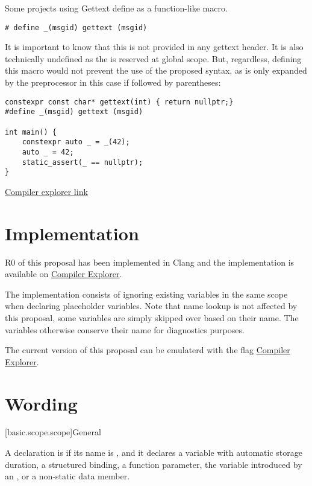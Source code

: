 \documentclass{wg21}
\begin{document}
{Some projects using Gettext define \tcode{_} as a function-like macro.

\begin{lstlisting}[style=color]
# define _(msgid) gettext (msgid)
\end{lstlisting}

It is important to know that this is not provided in any gettext header.
It is also technically undefined as the \tcode{_} is reserved at global scope.
But, regardless, defining this macro would not prevent the use of the proposed syntax, as \tcode{_} is only
expanded by the preprocessor in this case if followed by parentheses:

\begin{lstlisting}[style=color]
constexpr const char* gettext(int) { return nullptr;}
#define _(msgid) gettext (msgid)

int main() {
    constexpr auto _ = _(42);
    auto _ = 42;
    static_assert(_ == nullptr);
}

\end{lstlisting}

\href{https://godbolt.org/z/FRFg9-}{Compiler explorer link}

\section{Implementation}

R0 of this proposal has been implemented in Clang and the implementation is available on \href{https://godbolt.org/z/5lmnfN}{Compiler Explorer}.

The implementation consists of ignoring existing \tcode{_} variables in the same scope when declaring placeholder variables.
Note that name lookup is not affected by this proposal, some variables are simply skipped over based on their name.
The variables otherwise conserve their name for diagnostics purposes.

The current version of this proposal can be emulaterd with the  flag \href{https://godbolt.org/z/_C6X7L}{Compiler Explorer}.


\section{Wording}

[basic.scope.scope]{General}

\begin{addedblock}
A declaration is  if its name is \tcode{_},
and it declares a variable with automatic storage duration, a structured binding, a function parameter, the variable introduced by an , or a non-static data member.


\end{addedblock}}
\end{document}
